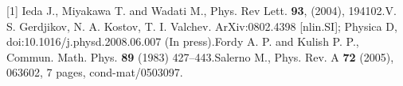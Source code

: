 [1] Ieda J., Miyakawa T. and Wadati M., Phys. Rev Lett. \textbf{93}, (2004), 194102.\newline
[2] V. S. Gerdjikov, N. A. Kostov, T. I. Valchev.  ArXiv:0802.4398 [nlin.SI];\newline
Physica D, doi:10.1016/j.physd.2008.06.007 (In press).\newline
[3] Fordy A. P. and Kulish P. P., Commun. Math. Phys. \textbf{89} (1983) 427--443.\newline
[4] Salerno M., Phys. Rev. A \textbf{72}  (2005), 063602, 7 pages, cond-mat/0503097.\newline

\vspace{\baselineskip}